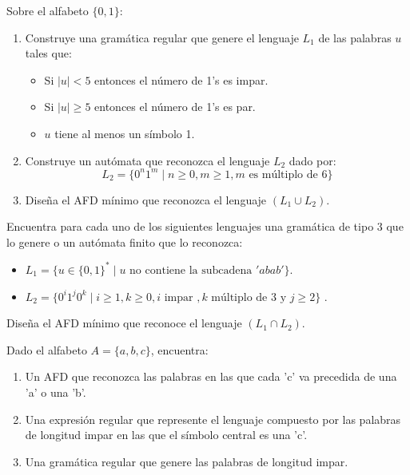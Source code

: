 \begin{ejercicio}\label{ej:1.3.23}
    Sobre el alfabeto $\{0,1\}$:
    \begin{enumerate}[label=(\alph*)]
        \item Construye una gramática regular que genere el lenguaje $L_1$ de las palabras $u$ tales que:
            \begin{itemize}
                \item Si $|u|< 5$ entonces el número de 1's es impar.
                \item Si $|u|\geq 5$ entonces el número de 1's es par.
                \item $u$ tiene al menos un símbolo 1.
            \end{itemize}
        \item Construye un autómata que reconozca el lenguaje $L_2$ dado por:
            \begin{equation*}
                L_2 = \{0^n 1^m \mid n\geq 0, m\geq 1, m \text{\ es múltiplo de\ } 6\}
            \end{equation*}
        \item Diseña el AFD mínimo que reconozca el lenguaje $(L_1 \cup L_2)$.
    \end{enumerate}
\end{ejercicio}

\begin{ejercicio}\label{ej:1.3.24}
    Encuentra para cada uno de los siguientes lenguajes una gramática de tipo 3 que lo genere o un autómata finito que lo reconozca:
    \begin{itemize}
        \item $L_1 = \{u\in {\{0,1\}}^{\ast} \mid u \text{\ no contiene la subcadena } 'abab'\}$.
        \item $L_2 = \{0^i 1^j 0^k \mid i \geq 1, k\geq 0, i \text{\ impar\ }, k \text{\ múltiplo de\ } 3 \text{\ y\ } j\geq 2\}$ .
    \end{itemize}
    Diseña el AFD mínimo que reconoce el lenguaje $(L_1\cap L_2)$.
\end{ejercicio}

\begin{ejercicio}\label{ej:1.3.25}
    Dado el alfabeto $A=\{a,b,c\}$, encuentra:
    \begin{enumerate}
        \item Un AFD que reconozca las palabras en las que cada 'c' va precedida de una 'a' o una 'b'.
        \item Una expresión regular que represente el lenguaje compuesto por las palabras de longitud impar en las que el símbolo central es una 'c'.
        \item Una gramática regular que genere las palabras de longitud impar.
    \end{enumerate}
\end{ejercicio}

